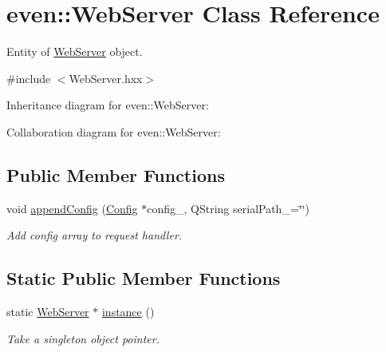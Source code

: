 \hypertarget{classeven_1_1_web_server}{}\section{even\+:\+:Web\+Server Class Reference}
\label{classeven_1_1_web_server}


Entity of \mbox{\hyperlink{classeven_1_1_web_server}{Web\+Server}} object.  




{\ttfamily \#include $<$Web\+Server.\+hxx$>$}



Inheritance diagram for even\+:\+:Web\+Server\+:


Collaboration diagram for even\+:\+:Web\+Server\+:
\subsection*{Public Member Functions}
\begin{DoxyCompactItemize}
\item 
\mbox{\label{classeven_1_1_web_server_a39b1c45fab441a7f6ff0198328d5c8b0}} 
void \mbox{\hyperlink{classeven_1_1_web_server_a39b1c45fab441a7f6ff0198328d5c8b0}{append\+Config}} (\mbox{\hyperlink{classeven_1_1_config}{Config}} $\ast$config\+\_\+, Q\+String serial\+Path\+\_\+=\char`\"{}\char`\"{})
\begin{DoxyCompactList}\small\item\em Add config array to request handler. \end{DoxyCompactList}\end{DoxyCompactItemize}
\subsection*{Static Public Member Functions}
\begin{DoxyCompactItemize}
\item 
\mbox{\label{classeven_1_1_web_server_ad802d4d7d8a15147164ca20b48025492}} 
static \mbox{\hyperlink{classeven_1_1_web_server}{Web\+Server}} $\ast$ \mbox{\hyperlink{classeven_1_1_web_server_ad802d4d7d8a15147164ca20b48025492}{instance}} ()
\begin{DoxyCompactList}\small\item\em Take a singleton object pointer. \end{DoxyCompactList}\end{DoxyCompactItemize}
